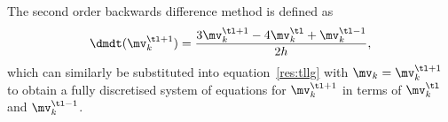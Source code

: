 The second order backwards difference method is defined as\cite{Atkinson2009}
\begin{equation}
  \label{eq:bdf2-scheme}
  \dmdt(\mv_k^{\tl+1}) = \frac{3 \mv_k^{\tl+1} - 4 \mv_k^{\tl} + \mv_k^{\tl-1}}{2h},
\end{equation}
which can similarly be substituted into equation~\eqref{res:tllg} with $\mv_k = \mv_k^{\tl+1}$ to obtain a fully discretised system of equations for $\mv_k^{\tl+1}$ in terms of $\mv_k^\tl$ and $\mv_k^{\tl-1}$.

